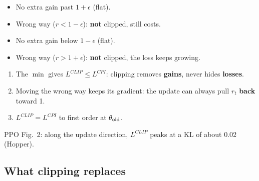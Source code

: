 \begin{pair}
\begin{coolbox}[title={$\hat A_t>0$: raise $\pi(a_t\mid s_t)$}]
\small
\begin{itemize}
  \item No extra gain past $1+\epsilon$ (flat).
  \item Wrong way ($r<1-\epsilon$): \textbf{not} clipped, still costs.
\end{itemize}
\end{coolbox}
\begin{coolbox}[title={$\hat A_t<0$: lower $\pi(a_t\mid s_t)$}]
\small
\begin{itemize}
  \item No extra gain below $1-\epsilon$ (flat).
  \item Wrong way ($r>1+\epsilon$): \textbf{not} clipped, the loss keeps growing.
\end{itemize}
\end{coolbox}
\end{pair}

\begin{keybox}[title={A pessimistic bound}]
\begin{enumerate}
  \item The $\min$ gives $L^{CLIP}\le L^{CPI}$: clipping removes \textbf{gains}, never hides \textbf{losses}.
  \item Moving the wrong way keeps its gradient: the update can always pull $r_t$ \textbf{back} toward 1.
  \item $L^{CLIP}=L^{CPI}$ to first order at $\theta_{\mathrm{old}}$.
\end{enumerate}
\end{keybox}

{\small PPO Fig.~2: along the update direction, $L^{CLIP}$ peaks at a KL of about 0.02 (Hopper).}

\subsection{What clipping replaces}

